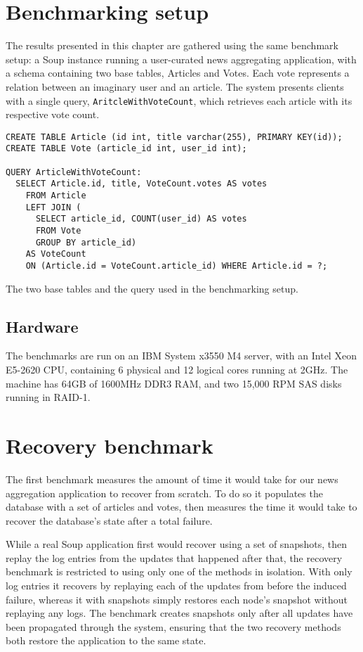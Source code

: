 \documentclass[b5paper]{report}
\begin{document}
\section{Benchmarking setup} \label{sec:vote}
The results presented in this chapter are gathered using the same benchmark
setup: a Soup instance running a user-curated news aggregating
application, with a schema containing two base tables, Articles and Votes. Each vote
represents a relation between an imaginary user and an article. The system
presents clients with a single query, \texttt{AritcleWithVoteCount}, which
retrieves each article with its respective vote count.

\begin{listing}[H]
  \begin{verbatim}
CREATE TABLE Article (id int, title varchar(255), PRIMARY KEY(id));
CREATE TABLE Vote (article_id int, user_id int);

QUERY ArticleWithVoteCount:
  SELECT Article.id, title, VoteCount.votes AS votes
    FROM Article
    LEFT JOIN (
      SELECT article_id, COUNT(user_id) AS votes
      FROM Vote
      GROUP BY article_id)
    AS VoteCount
    ON (Article.id = VoteCount.article_id) WHERE Article.id = ?;
\end{verbatim}
  \caption{
    The two base tables and the query used in the benchmarking setup.
    \label{lst:benchmark-schema}
  }
\end{listing}

\subsection{Hardware}
The benchmarks are run on an IBM System x3550 M4 server, with an Intel Xeon
E5-2620 CPU, containing 6 physical and 12 logical cores running at 2GHz. The machine
has 64GB of 1600MHz DDR3 RAM, and two 15,000 RPM SAS disks running in RAID-1.

\section{Recovery benchmark}
The first benchmark measures the amount of time it would take for our news
aggregation application to recover from scratch. To do so it populates the
database with a set of articles and votes, then measures the time it
would take to recover the database's state after a total failure.

While a real Soup application first would recover using a set of snapshots, then
replay the log entries from the updates that happened after that, the recovery
benchmark is restricted to using only one of the methods in isolation. With
only log entries it recovers by replaying each of the updates from before the
induced failure, whereas it with snapshots simply restores each node's snapshot
without replaying any logs. The benchmark creates snapshots only after all
updates have been propagated through the system, ensuring that the two recovery
methods both restore the application to the same state.
\end{document}
